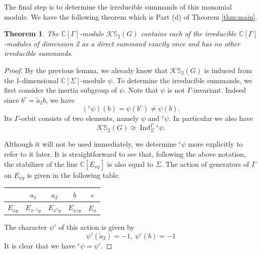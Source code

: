 \documentclass[12pt]{article}
\theoremstyle{plain}
\newtheorem{theorem}{Theorem}[section]
\theoremstyle{definition}
\newcommand{\kerlint}{\mathbb S_2}
\newcommand{\ind}{\operatorname{Ind}}
\begin{document}
The final step is to determine the irreducible summands of this monomial module. We have the following theorem which is Part (d) of Theorem \ref{thm:main}.
\begin{theorem}
    The $\mathbb C[\Gamma]$-module $\mathcal{K}\kerlint(G)$ contains each of the irreducible $\mathbb C[\Gamma]$-modules of dimension 2 as a direct summand exactly once and has no other irreducible summands. 
\end{theorem}
\begin{proof}
By the previous lemma, we already know that $\mathcal{K}\kerlint(G)$ is induced from the 1-dimensional $\mathbb C[\Sigma]$-module $\psi$. To determine the irreducible summands, we first consider the inertia subgroup of $\psi$. Note that $\psi$ is not $\Gamma$-invariant. Indeed since $b^c = \tilde a_2b$, we have 
\[
({}^c\psi)(b) = \psi(b^c)\neq \psi(b).
\]
Its $\Gamma$-orbit consists of two elements, namely $\psi$ and ${}^c\psi$. In particular we also have
\[
\mathcal K\kerlint(G) \cong \ind_\Sigma^\Gamma {}^c\psi.
\]

Although it will not be used immediately, we determine ${}^c\psi$ more explicitly to refer to it later. It is straightforward to see that, following the above notation, the stabilizer of the line $\mathbb C[E_{xy}]$ is also equal to $\Sigma$. The action of generators of $\Gamma$ on $E_{xy}$ is given in the following table.
\begin{center}
    \begin{tabular}{c|cccc}
         & $a_1$ & $a_2$ & $b$ & $c$ \\ \hline
         $E_{xy}$ & $E_{x^{-1}y}$ & $E_{x^5y}$ & $E_{xzy}$ & $E_{x}$\\
           \end{tabular}
\end{center}
The character $\psi'$ of this action is given by 
\[
\psi'(\tilde a_2) = -1, \ \psi'(b)= -1
\]
It is clear that we have ${}^c\psi = \psi'$. 


\end{proof}
\end{document}
